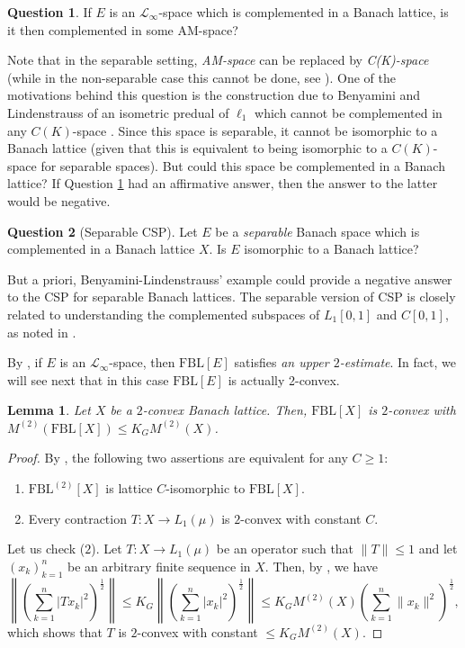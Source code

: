 \documentclass[11pt]{amsart}
\newtheorem{lem}[thm]{Lemma}
\theoremstyle{definition}
\newtheorem{question}{Question}
\numberwithin{equation}{section}
\newcommand{\fbl}{\text{FBL}}
\begin{document}
\begin{question}\label{question:complemented-script-l-infinity}
 If $E$ is an $\mathcal{L}_\infty$-space which is complemented in a Banach lattice, is it then complemented in some AM-space?    
\end{question}

Note that in the separable setting, \textit{AM-space} can be replaced by \textit{C(K)-space} \cite{B73} (while in the non-separable case this cannot be done, see \cite{B77}). One of the motivations behind this question is the construction due to Benyamini and Lindenstrauss of an isometric predual of $\ell_1$ which cannot be complemented in any $C(K)$-space \cite{BL}. Since this space is separable, it cannot be isomorphic to a Banach lattice (given that this is equivalent to being isomorphic to a $C(K)$-space for separable spaces). But could this space be complemented in a Banach lattice? If Question \ref{question:complemented-script-l-infinity} had an affirmative answer, then the answer to the latter would be negative. 

\begin{question}[Separable CSP]
Let $E$ be a \textit{separable} Banach space which is complemented in a Banach lattice $X$. Is $E$ isomorphic to a Banach lattice?    
\end{question}

But a priori, Benyamini-Lindenstrauss' example could provide a negative answer to the CSP for separable Banach lattices. The separable version of CSP is closely related to understanding the complemented subspaces of $L_1[0,1]$ and $C[0,1]$, as noted in \cite[Remark 2.5]{dHMST23}.

By \cite[Theorem 9.21]{OTTT24}, if $E$ is an $\mathcal{L}_\infty$-space, then $\fbl[E]$ satisfies \textit{an upper $2$-estimate}. In fact, we will see next that in this case $\fbl[E]$ is actually 2-convex.

\begin{lem}
    Let $X$ be a $2$-convex Banach lattice. Then, $\fbl[X]$ is $2$-convex with $M^{(2)}(\fbl[X])\leq K_G M^{(2)}(X)$.    
\end{lem}
\begin{proof}
By \cite[Proposition 9.38]{OTTT24}, the following two assertions are equivalent for any $C\geq 1$:
\begin{enumerate}
    \item $\fbl^{(2)}[X]$ is lattice $C$-isomorphic to $\fbl[X]$.
    \item Every contraction $T:X\to L_1(\mu)$ is $2$-convex with constant $C$.
\end{enumerate}
Let us check ($2$). Let $T:X\to L_1(\mu)$ be an operator such that $\|T\|\leq 1$ and let $(x_k)_{k=1}^n$ be an arbitrary finite sequence in $X$. Then, by \cite[Theorem 1.f.14]{LT2-book}, we have
$$
\left\|\left(\sum_{k=1}^n|Tx_k|^2\right)^\frac{1}{2}\right\|\leq K_G\left\|\left(\sum_{k=1}^n|x_k|^2\right)^\frac{1}{2}\right\|\leq K_G M^{(2)}(X) \left(\sum_{k=1}^n \|x_k\|^2\right)^\frac{1}{2},
$$
which shows that $T$ is $2$-convex with constant $\leq K_G M^{(2)}(X)$.
\end{proof}
\end{document}
